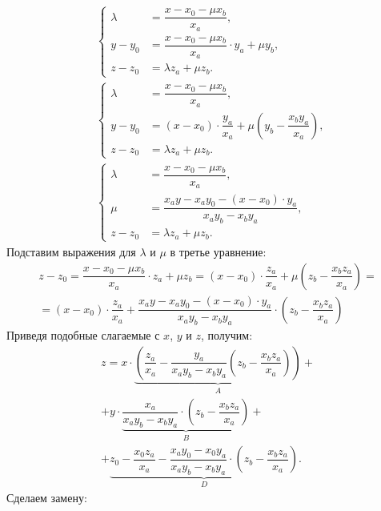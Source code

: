 \begin{align*}
& \left\{
\begin{aligned}
	\lambda &= \dfrac{x - x_0 - \mu x_b}{x_a},\\
	y - y_0 &= \dfrac{x - x_0 - \mu x_b}{x_a} \cdot y_a + \mu y_b,\\
	z - z_0 &= \lambda z_a + \mu z_b.
\end{aligned}\right.\\
& \left\{
\begin{aligned}
	\lambda &= \dfrac{x - x_0 - \mu x_b}{x_a},\\
	y - y_0 &= (x - x_0) \cdot \dfrac{y_a}{x_a} + \mu \left(y_b - \dfrac{x_b y_a}{x_a} \right),\\
	z - z_0 &= \lambda z_a + \mu z_b.
\end{aligned}\right.\\
&\left\{
\begin{aligned}
	\lambda &= \dfrac{x - x_0 - \mu x_b}{x_a},\\
	\mu &= \dfrac{x_a y - x_a y_0 - (x - x_0) \cdot y_a}{x_a y_b - x_b y_a},\\
	z - z_0 &= \lambda z_a + \mu z_b.
\end{aligned}\right.
\end{align*}
Подставим выражения для $\lambda$ и $\mu$ в третье уравнение:
\begin{multline*}
    z - z_0 = \dfrac{x - x_0 - \mu x_b}{x_a} \cdot z_a + \mu z_b = (x - x_0) \cdot \dfrac{z_a}{x_a} + \mu \left( z_b - \dfrac{x_b z_a}{x_a} \right) = \\
    = (x - x_0) \cdot \dfrac{z_a}{x_a} + \dfrac{x_a y - x_a y_0 - (x - x_0) \cdot y_a}{x_a y_b - x_b y_a} \cdot \left( z_b - \dfrac{x_b z_a}{x_a} \right)
\end{multline*}
Приведя подобные слагаемые с $x$, $y$ и $z$, получим:
\begin{multline*}
z = x \cdot \underbrace{\left( \dfrac{z_a}{x_a} - \dfrac{y_a}{x_a y_b - x_b y_a} \left( z_b - \dfrac{x_b z_a}{x_a} \right) \right)}_A +\\
+ y \cdot \underbrace{\dfrac{x_a}{x_a y_b - x_b y_a} \cdot \left( z_b - \dfrac{x_b z_a}{x_a} \right)}_B +\\
+ \underbrace{z_0 - \dfrac{x_0 z_a}{x_a} - \dfrac{x_a y_0 - x_0 y_a}{x_a y_b - x_b y_a} \cdot \left( z_b - \dfrac{x_b z_a}{x_a} \right)}_D.
\end{multline*}
Сделаем замену:
